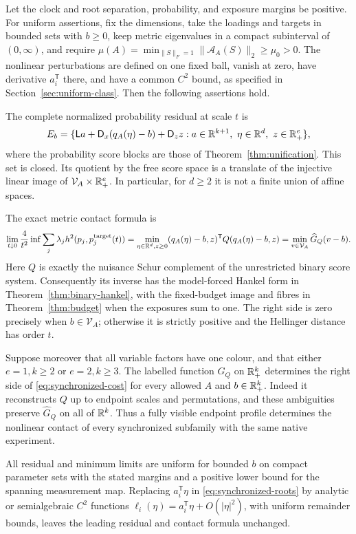 \begin{theorem}\label{thm:synchronized}
Let the clock and root separation, probability, and exposure margins be positive. For uniform assertions, fix the dimensions, take the loadings and targets in bounded sets with $b\ge0$, keep metric eigenvalues in a compact subinterval of $(0,\infty)$, and require $\mu(A)=\min_{\|S\|_F=1}\|\mathcal A_A(S)\|_2\ge\mu_0>0$. The nonlinear perturbations are defined on one fixed ball, vanish at zero, have derivative $a_i^{\mathsf T}$ there, and have a common $C^2$ bound, as specified in Section~\ref{sec:uniform-class}. Then the following assertions hold.

The complete normalized probability residual at scale $t$ is
\begin{equation}\label{eq:synchronized-E}
 E_b=\{\mathsf La+\mathsf D_x(q_A(\eta)-b)+\mathsf D_z z:
 a\in\mathbb R^{k+1},\ \eta\in\mathbb R^d,\ z\in\mathbb R_+^e\},
\end{equation}
where the probability score blocks are those of Theorem~\ref{thm:unification}. This set is closed. Its quotient by the free score space is a translate of the injective linear image of $\mathcal V_A\times\mathbb R_+^e$. In particular, for $d\ge2$ it is not a finite union of affine spaces.

The exact metric contact formula is
\begin{equation}\label{eq:synchronized-cost}
 \lim_{t\downarrow0}\frac4{t^2}\inf
 \sum_j\lambda_j h^2(p_j,p_j^{\rm target}(t))
 =\min_{\eta\in\mathbb R^d,z\ge0}(q_A(\eta)-b,z)^{\mathsf T}Q(q_A(\eta)-b,z)
 =\min_{v\in\mathcal V_A}\widehat G_Q(v-b).
\end{equation}
Here $Q$ is exactly the nuisance Schur complement of the unrestricted binary score system. Consequently its inverse has the model-forced Hankel form in Theorem~\ref{thm:binary-hankel}, with the fixed-budget image and fibres in Theorem~\ref{thm:budget} when the exposures sum to one. The right side is zero precisely when $b\in\mathcal V_A$; otherwise it is strictly positive and the Hellinger distance has order $t$.

Suppose moreover that all variable factors have one colour, and that either $e=1,k\ge2$ or $e=2,k\ge3$. The labelled function $G_Q$ on $\mathbb R_+^k$ determines the right side of \eqref{eq:synchronized-cost} for every allowed $A$ and $b\in\mathbb R_+^k$. Indeed it reconstructs $Q$ up to endpoint scales and permutations, and these ambiguities preserve $\widehat G_Q$ on all of $\mathbb R^k$. Thus a fully visible endpoint profile determines the nonlinear contact of every synchronized subfamily with the same native experiment.

All residual and minimum limits are uniform for bounded $b$ on compact parameter sets with the stated margins and a positive lower bound for the spanning measurement map. Replacing $a_i^{\mathsf T}\eta$ in \eqref{eq:synchronized-roots} by analytic or semialgebraic $C^2$ functions $\ell_i(\eta)=a_i^{\mathsf T}\eta+O(|\eta|^2)$, with uniform remainder bounds, leaves the leading residual and contact formula unchanged.
\end{theorem}
